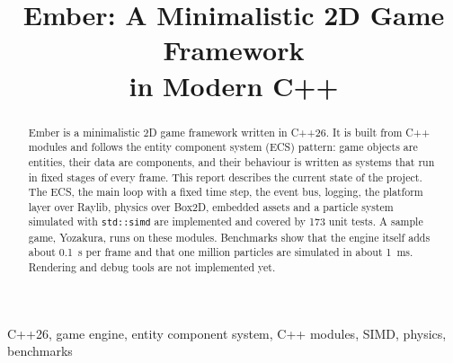 \documentclass[conference]{IEEEtran}
\newcommand{\code}[1]{\texttt{#1}}
\begin{document}
\title{Ember: A Minimalistic 2D Game Framework\\in Modern C++}

\author{
\and
{}
\and
{}
\and
{}
}

\maketitle

\begin{abstract}
Ember is a minimalistic 2D game framework written in C++26. It is built from C++ modules
and follows the entity component system (ECS) pattern: game objects are entities, their data are components, and their behaviour is
written as systems that run in fixed stages of every frame. This report describes the
current state of the project. The ECS, the main loop with a fixed time step, the event
bus, logging, the platform layer over Raylib, physics over Box2D, embedded assets and a
particle system simulated with \code{std::simd} are implemented and covered by 173 unit
tests. A sample game, Yozakura, runs on these modules. Benchmarks show that the engine
itself adds about 0.1~\textmu s per frame and that one million particles are simulated in
about 1~ms. Rendering and debug tools are not implemented yet.
\end{abstract}

\begin{IEEEkeywords}
C++26, game engine, entity component system, C++ modules, SIMD, physics, benchmarks
\end{IEEEkeywords}
\end{document}
